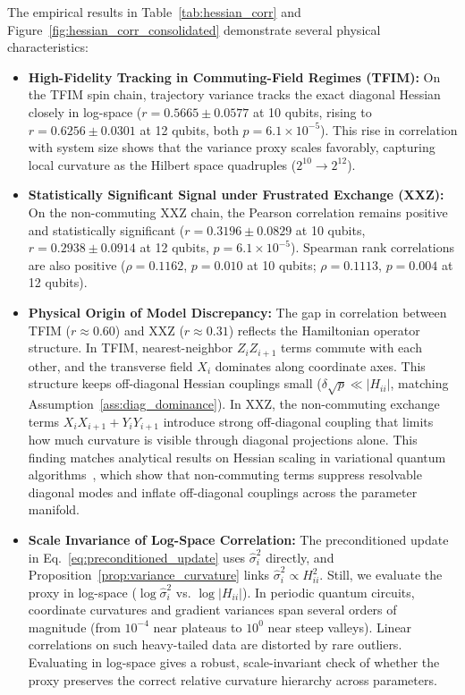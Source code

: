 \documentclass[11pt,a4paper]{article}
\begin{document}
The empirical results in Table~\ref{tab:hessian_corr} and Figure~\ref{fig:hessian_corr_consolidated} demonstrate several physical characteristics:
\begin{itemize}
    \item \textbf{High-Fidelity Tracking in Commuting-Field Regimes (TFIM):} On the TFIM spin chain, trajectory variance tracks the exact diagonal Hessian closely in log-space ($r = 0.5665 \pm 0.0577$ at 10 qubits, rising to $r = 0.6256 \pm 0.0301$ at 12 qubits, both $p = 6.1 \times 10^{-5}$). This rise in correlation with system size shows that the variance proxy scales favorably, capturing local curvature as the Hilbert space quadruples ($2^{10} \to 2^{12}$).
    \item \textbf{Statistically Significant Signal under Frustrated Exchange (XXZ):} On the non-commuting XXZ chain, the Pearson correlation remains positive and statistically significant ($r = 0.3196 \pm 0.0829$ at 10 qubits, $r = 0.2938 \pm 0.0914$ at 12 qubits, $p = 6.1 \times 10^{-5}$). Spearman rank correlations are also positive ($\rho = 0.1162$, $p = 0.010$ at 10 qubits; $\rho = 0.1113$, $p = 0.004$ at 12 qubits).
    \item \textbf{Physical Origin of Model Discrepancy:} The gap in correlation between TFIM ($r \approx 0.60$) and XXZ ($r \approx 0.31$) reflects the Hamiltonian operator structure. In TFIM, nearest-neighbor $Z_i Z_{i+1}$ terms commute with each other, and the transverse field $X_i$ dominates along coordinate axes. This structure keeps off-diagonal Hessian couplings small ($\delta \sqrt{p} \ll |H_{ii}|$, matching Assumption~\ref{ass:diag_dominance}). In XXZ, the non-commuting exchange terms $X_i X_{i+1} + Y_i Y_{i+1}$ introduce strong off-diagonal coupling that limits how much curvature is visible through diagonal projections alone. This finding matches analytical results on Hessian scaling in variational quantum algorithms~\cite{hessian_resolvability_2026}, which show that non-commuting terms suppress resolvable diagonal modes and inflate off-diagonal couplings across the parameter manifold.
    \item \textbf{Scale Invariance of Log-Space Correlation:} The preconditioned update in Eq.~\eqref{eq:preconditioned_update} uses $\hat{\sigma}_i^2$ directly, and Proposition~\ref{prop:variance_curvature} links $\hat{\sigma}_i^2 \propto H_{ii}^2$. Still, we evaluate the proxy in log-space ($\log \hat{\sigma}_i^2$ vs. $\log |H_{ii}|$). In periodic quantum circuits, coordinate curvatures and gradient variances span several orders of magnitude (from $10^{-4}$ near plateaus to $10^0$ near steep valleys). Linear correlations on such heavy-tailed data are distorted by rare outliers. Evaluating in log-space gives a robust, scale-invariant check of whether the proxy preserves the correct relative curvature hierarchy across parameters.
\end{itemize}
\end{document}
